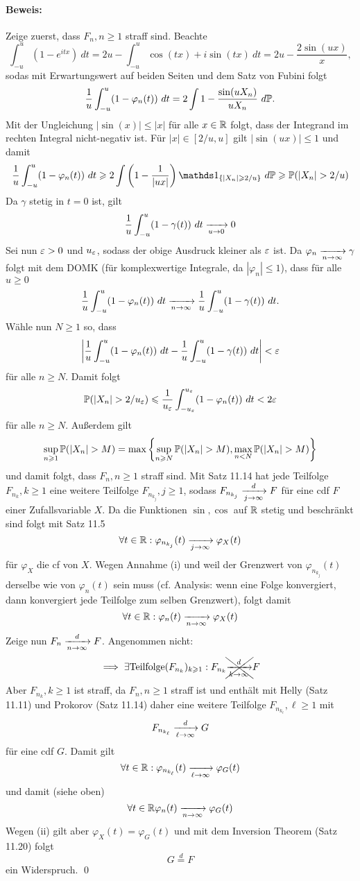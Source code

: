 \paragraph{Beweis:}Zeige zuerst, dass $F_n,n\geq1$ straff sind. Beachte 
$$\int_{-u}^u(1-e^{itx})\ dt=2u-\int_{-u}^u\cos(tx)+i\sin(tx)\ dt=2u-\dfrac{2\sin(ux)}{x},$$
sodas mit Erwartungswert auf beiden Seiten und dem Satz von Fubini folgt
$$\dfrac{1}{u}\int_{-u}^u(1-\varphi_n(t))\ dt=2\int1-\dfrac{\sin(uX_n)}{uX_n}\ d\Pp.$$
Mit der Ungleichung $|\sin(x)|\leq |x|$ f\"ur alle $x\in\mathbb{R}$ folgt, dass der Integrand im rechten Integral nicht-negativ ist. F\"ur $|x|\in[2/u,u]$ gilt $|\sin(ux)|\leq1$ und damit 
$$\dfrac{1}{u}\int_{-u}^u(1-\varphi_n(t))\ dt\geq2\int\left(1-\dfrac{1}{|ux|}\right)\ind{\{|X_n|\geq2/u\}}\ d\Pp\geq\Pp(|X_n|>2/u)$$
Da $\gamma$ stetig in $t=0$ ist, gilt 
$$\dfrac{1}{u}\int_{-u}^u(1-\gamma(t))\ dt\nto{}{u\to0}0$$
Sei nun $\varepsilon>0$ und $u_\varepsilon$, sodass der obige Ausdruck kleiner als $\varepsilon$ ist. Da $\varphi_n\nto{}{n\to\infty}\gamma$ folgt mit dem DOMK (f\"ur komplexwertige Integrale, da $|\varphi_n|\leq1$), dass f\"ur alle $u\geq0$
$$\dfrac{1}{u}\int_{-u}^u(1-\varphi_n(t))\ dt\nto{}{n\to\infty}\dfrac{1}{u}\int_{-u}^u(1-\gamma(t))\ dt.$$
W\"ahle nun $N\geq1$ so, dass 
$$\left|\dfrac{1}{u}\int_{-u}^u(1-\varphi_n(t))\ dt-\dfrac{1}{u}\int_{-u}^u(1-\gamma(t))\ dt\right|<\eps$$
f\"ur alle $n\geq N$. Damit folgt 
$$\Pp(|X_n|>2/u_\eps)\leq\frac{1}{u_\eps}\int_{-u_\eps}^{u_\eps}(1-\varphi_n(t))\ dt<2\eps$$
f\"ur alle $n\geq N$. Au\ss{}erdem gilt
$$\sup_{n\geq1}\Pp(|X_n|>M)=\max\left\{\sup_{n\geq N}\Pp(|X_n|>M),\max_{n<N}\Pp(|X_n|>M)\right\}$$
und damit folgt, dass $F_n,n\geq1$ straff sind. Mit Satz 11.14 hat jede Teilfolge $F_{n_k},k\geq1$ eine weitere Teilfolge $F_{n_{k_j}},j\geq1$, sodass $F_{n_{k_j}}\nto{d}{j\to\infty}F$ f\"ur eine cdf $F$ einer Zufallsvariable $X$. Da die Funktionen $\sin,\cos$ auf $\mathbb{R}$ stetig und beschr\"ankt sind folgt mit Satz 11.5
$$\forall t\in\R:\varphi_{n_{k_j}}(t)\nto{}{j\to\infty}\varphi_X(t)$$
f\"ur $\varphi_X$ die cf von $X$. Wegen Annahme (i) und weil der Grenzwert von $\varphi_{n_{k_j}}(t)$ derselbe wie von $\varphi_n(t)$ sein muss (cf. Analysis: wenn eine Folge konvergiert, dann konvergiert jede Teilfolge zum selben Grenzwert), folgt damit
$$\forall t\in\R:\varphi_n(t)\nto{}{n\to\infty}\varphi_X(t)$$
Zeige nun $F_n\nto{d}{n\to\infty}F$. Angenommen nicht: 
$$\implies\exists\text{Teilfolge} (F_{n_k})_{k\geq1}:F_{n_k}\xcancel{\nto{d}{k\to\infty}}F$$
Aber $F_{n_k},k\geq1$ ist straff, da $F_n,n\geq1$ straff ist und enth\"alt mit Helly (Satz 11.11) und Prokorov (Satz 11.14) daher eine weitere Teilfolge $F_{n_{k_\ell}},\ell\geq1$ mit 
$$F_{n_{k_\ell}}\nto{d}{\ell\to\infty}G$$
f\"ur eine cdf $G$. Damit gilt
$$\forall t\in\R:\varphi_{n_{k_\ell}}(t)\nto{}{\ell\to\infty}\varphi_G(t)$$
und damit (siehe oben) 
$$\forall t\in\R\varphi_n(t)\nto{}{n\to\infty}\varphi_G(t)$$
Wegen (ii) gilt aber $\varphi_X(t)=\varphi_G(t)$ und mit dem Inversion Theorem (Satz 11.20) folgt
$$G\overset{d}{=}F$$
ein Widerspruch. \qed

